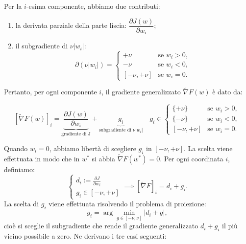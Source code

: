 \documentclass[a4paper,12pt]{article}
\numberwithin{equation}{section}
\numberwithin{figure}{section}
\numberwithin{table}{section}
\begin{document}
Per la $i$-esima componente, abbiamo due contributi:

\begin{enumerate}
    \item la derivata parziale della parte liscia: $\dfrac{\partial J(w)}{\partial w_i}$;
    \item il subgradiente di $\nu |w_i|$:
    \[
    \partial (\nu |w_i|) =
    \begin{cases}
    +\nu & \text{se } w_i > 0, \\
    -\nu & \text{se } w_i < 0, \\
    [-\nu, +\nu] & \text{se } w_i = 0.
    \end{cases}
    \]
    \end{enumerate}

Pertanto, per ogni componente $i$, il gradiente generalizzato $\widetilde{\nabla} F(w)$
è dato da:

\[
[\widetilde{\nabla} F(w)]_i =
\underbrace{\frac{\partial J(w)}{\partial w_i}}_{\text{gradiente di J}}
+
\underbrace{g_i}_{\text{subgradiente di }\nu |w_i|} \quad
g_i \in
\begin{cases}
\{+\nu\} & \text{se } w_i > 0, \\
\{-\nu\} & \text{se } w_i < 0, \\
[-\nu, +\nu] & \text{se } w_i = 0.
\end{cases}
\]


Quando $w_i = 0$, abbiamo libertà di scegliere $g_i$ in $[-\nu, +\nu]$.
La scelta viene effettuata in modo che in $w^*$ si abbia $\widetilde{\nabla}F(w^*) = 0$.
Per ogni coordinata \(i\), definiamo:
\[
\begin{cases}d_i := \frac{\partial J}{\partial w_i} \\
g_i \in [-\nu, +\nu]\end{cases}\implies 
[\widetilde{\nabla}F]_i = d_i + g_i.
\]
La scelta di \(g_i\) viene effettuata risolvendo il problema di proiezione:
\[
g_i = \arg\min_{g \in [-\nu, \nu]} |d_i + g|,
\]
cioè si sceglie il subgradiente che rende il gradiente generalizzato \(d_i + g_i\) il più vicino possibile a zero. Ne derivano i tre casi seguenti:
\end{document}
